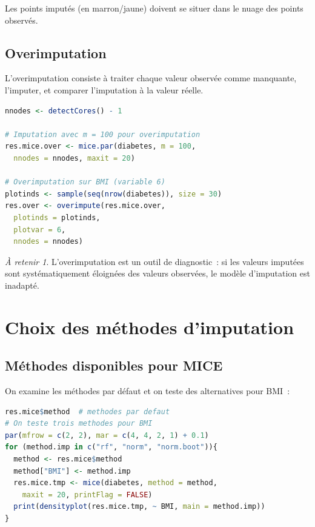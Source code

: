 \documentclass[a4paper,11pt]{article}
\theoremstyle{definition}
\theoremstyle{remark}
\newtheorem*{important}{\`A retenir}
\begin{document}
Les points imput\'es (en marron/jaune) doivent se situer dans le
nuage des points observ\'es.

\subsection{Overimputation}

L'overimputation consiste \`a traiter chaque valeur observ\'ee comme
manquante, l'imputer, et comparer l'imputation \`a la valeur r\'eelle.

\begin{lstlisting}[language=R]
nnodes <- detectCores() - 1

# Imputation avec m = 100 pour overimputation
res.mice.over <- mice.par(diabetes, m = 100,
  nnodes = nnodes, maxit = 20)

# Overimputation sur BMI (variable 6)
plotinds <- sample(seq(nrow(diabetes)), size = 30)
res.over <- overimpute(res.mice.over,
  plotinds = plotinds,
  plotvar = 6,
  nnodes = nnodes)
\end{lstlisting}

\begin{important}
  L'overimputation est un outil de diagnostic~: si les valeurs
  imput\'ees sont syst\'ematiquement \'eloign\'ees des valeurs
  observ\'ees, le mod\`ele d'imputation est inadapt\'e.
\end{important}

\section{Choix des m\'ethodes d'imputation}

\subsection{M\'ethodes disponibles pour MICE}

On examine les m\'ethodes par d\'efaut et on teste des alternatives
pour BMI~:

\begin{lstlisting}[language=R]
res.mice$method  # methodes par defaut
# On teste trois methodes pour BMI
par(mfrow = c(2, 2), mar = c(4, 4, 2, 1) + 0.1)
for (method.imp in c("rf", "norm", "norm.boot")){
  method <- res.mice$method
  method["BMI"] <- method.imp
  res.mice.tmp <- mice(diabetes, method = method,
    maxit = 20, printFlag = FALSE)
  print(densityplot(res.mice.tmp, ~ BMI, main = method.imp))
}
\end{lstlisting}
\end{document}
